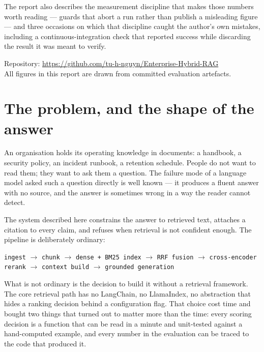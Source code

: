 \documentclass[11pt,a4paper]{article}
\newcommand{\code}[1]{\texttt{\small #1}}
\begin{document}
\begin{titlepage}
\begin{minipage}{0.86\textwidth}
The report also describes the measurement discipline that makes those numbers
worth reading --- guards that abort a run rather than publish a misleading
figure --- and three occasions on which that discipline caught the author's own
mistakes, including a continuous-integration check that reported success while
discarding the result it was meant to verify.
\end{minipage}

\vfill
{\color{ink}\small
Repository: \url{https://github.com/tu-h-nguyn/Enterprise-Hybrid-RAG}\\
All figures in this report are drawn from committed evaluation artefacts.\par}
\vspace{1cm}
\end{titlepage}

\tableofcontents
\newpage

\section{The problem, and the shape of the answer}

An organisation holds its operating knowledge in documents: a handbook, a
security policy, an incident runbook, a retention schedule. People do not want to
read them; they want to ask them a question. The failure mode of a language model
asked such a question directly is well known --- it produces a fluent answer with
no source, and the answer is sometimes wrong in a way the reader cannot detect.

The system described here constrains the answer to retrieved text, attaches a
citation to every claim, and refuses when retrieval is not confident enough. The
pipeline is deliberately ordinary:

\begin{center}
\small
\code{ingest} $\rightarrow$ \code{chunk} $\rightarrow$ \code{dense + BM25 index}
$\rightarrow$ \code{RRF fusion} $\rightarrow$ \code{cross-encoder rerank}
$\rightarrow$ \code{context build} $\rightarrow$ \code{grounded generation}
\end{center}

What is not ordinary is the decision to build it without a retrieval framework.
The core retrieval path has no LangChain, no LlamaIndex, no abstraction that
hides a ranking decision behind a configuration flag. That choice cost time and
bought two things that turned out to matter more than the time: every scoring
decision is a function that can be read in a minute and unit-tested against a
hand-computed example, and every number in the evaluation can be traced to the
code that produced it.
\end{document}
